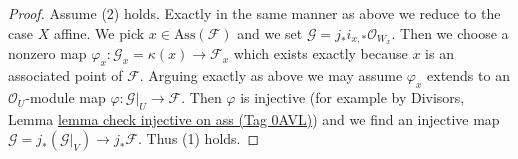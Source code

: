 \documentclass{amsart}
\theoremstyle{plain}
\theoremstyle{definition}
\theoremstyle{remark}
\numberwithin{equation}{subsection}
\begin{document}
\begin{proof}
\medskip\noindent
Assume (2) holds. Exactly in the same manner as above we reduce
to the case $X$ affine. We pick $x \in \text{Ass}(\mathcal{F})$
and we set $\mathcal{G} = j_*i_{x, *}\mathcal{O}_{W_x}$.
Then we choose a nonzero map
$\varphi_x : \mathcal{G}_x = \kappa(x) \to \mathcal{F}_x$
which exists exactly because $x$ is an associated point of $\mathcal{F}$.
Arguing exactly as above we may assume $\varphi_x$
extends to an $\mathcal{O}_U$-module map
$\varphi : \mathcal{G}|_U \to \mathcal{F}$.
Then $\varphi$ is injective (for example by
Divisors, Lemma \href{https://stacks.math.columbia.edu/tag/0AVL}{lemma check injective on ass (Tag 0AVL)})
and we find an injective map
$\mathcal{G} = j_*(\mathcal{G}|_V) \to j_*\mathcal{F}$.
Thus (1) holds.
\end{proof}
\end{document}
